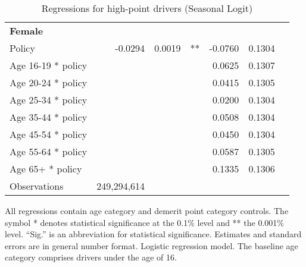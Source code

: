 \begin{table}
\begin{tabular}{l r r l r r l}
\hline 

\textbf{Female} \\ 

Policy             &  -0.0294        &  0.0019       &   **       &  -0.0760        &  0.1304       &            \\ 
Age 16-19 * policy           & & &  &  0.0625        &  0.1307       &            \\ 
Age 20-24 * policy           & & &  &  0.0415        &  0.1305       &            \\ 
Age 25-34 * policy           & & &  &  0.0200        &  0.1304       &            \\ 
Age 35-44 * policy           & & &  &  0.0508        &  0.1304       &            \\ 
Age 45-54 * policy           & & &  &  0.0450        &  0.1304       &            \\ 
Age 55-64 * policy           & & &  &  0.0587        &  0.1305       &            \\ 
Age 65+ * policy           & & &  &  0.1335        &  0.1306       &            \\ 
Observations & 249,294,614 \\ 


\hline 

\end{tabular} 
\caption{Regressions for high-point drivers (Seasonal Logit)} 
All regressions contain age category and demerit point category controls. 
The symbol * denotes statistical significance at the 0.1\% level 
and ** the 0.001\% level. 
``Sig.'' is an abbreviation for statistical significance. 
Estimates and standard errors are in general number format. 
Logistic regression model. 
The baseline age category comprises drivers under the age of 16. 
\label{tab:seas_logit_high_pt_regs} 
\end{table} 
 

